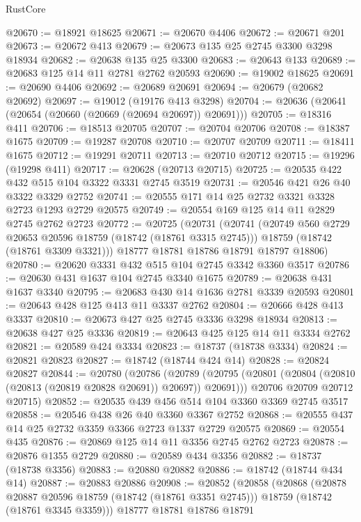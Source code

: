 \begin{lexlean}{RustCore}
\begin{coremodule}
@20670 := @18921 @18625
@20671 := @20670 @4406
@20672 := @20671 @201
@20673 := @20672 @413
@20679 := @20673 @135 @25 @2745 @3300 @3298 @18934
@20682 := @20638 @135 @25 @3300
@20683 := @20643 @133
@20689 := @20683 @125 @14 @11 @2781 @2762 @20593
@20690 := @19002 @18625
@20691 := @20690 @4406
@20692 := @20689 @20691
@20694 := @20679 (@20682 @20692)
@20697 := @19012 (@19176 @413 @3298)
@20704 := @20636 (@20641 (@20654 (@20660 (@20669 (@20694 @20697)) @20691)))
@20705 := @18316 @411
@20706 := @18513 @20705
@20707 := @20704 @20706
@20708 := @18387 @1675
@20709 := @19287 @20708
@20710 := @20707 @20709
@20711 := @18411 @1675
@20712 := @19291 @20711
@20713 := @20710 @20712
@20715 := @19296 (@19298 @411)
@20717 := @20628 (@20713 @20715)
@20725 := @20535 @422 @432 @515 @104 @3322 @3331 @2745 @3519
@20731 := @20546 @421 @26 @40 @3322 @3329 @2752
@20741 := @20555 @171 @14 @25 @2732 @3321 @3328 @2723 @1293 @2729 @20575
@20749 := @20554 @169 @125 @14 @11 @2829 @2745 @2762 @2723
@20772 := @20725
    (@20731
      (@20741
        (@20749 @560 @2729 @20653 @20596 @18759 (@18742 (@18761 @3315 @2745)))
        @18759
        (@18742 (@18761 @3309 @3321)))
      @18777
      @18781
      @18786
      @18791
      @18797
      @18806)
@20780 := @20620 @3331 @432 @515 @104 @2745 @3342 @3360 @3517
@20786 := @20630 @431 @1637 @104 @2745 @3340 @1675
@20789 := @20638 @431 @1637 @3340
@20795 := @20683 @430 @14 @1636 @2781 @3339 @20593
@20801 := @20643 @428 @125 @413 @11 @3337 @2762
@20804 := @20666 @428 @413 @3337
@20810 := @20673 @427 @25 @2745 @3336 @3298 @18934
@20813 := @20638 @427 @25 @3336
@20819 := @20643 @425 @125 @14 @11 @3334 @2762
@20821 := @20589 @424 @3334
@20823 := @18737 (@18738 @3334)
@20824 := @20821 @20823
@20827 := @18742 (@18744 @424 @14)
@20828 := @20824 @20827
@20844 := @20780
    (@20786
      (@20789 (@20795 (@20801 (@20804 (@20810 (@20813 (@20819 @20828 @20691)) @20697)) @20691)))
      @20706
      @20709
      @20712
      @20715)
@20852 := @20535 @439 @456 @514 @104 @3360 @3369 @2745 @3517
@20858 := @20546 @438 @26 @40 @3360 @3367 @2752
@20868 := @20555 @437 @14 @25 @2732 @3359 @3366 @2723 @1337 @2729 @20575
@20869 := @20554 @435
@20876 := @20869 @125 @14 @11 @3356 @2745 @2762 @2723
@20878 := @20876 @1355 @2729
@20880 := @20589 @434 @3356
@20882 := @18737 (@18738 @3356)
@20883 := @20880 @20882
@20886 := @18742 (@18744 @434 @14)
@20887 := @20883 @20886
@20908 := @20852
    (@20858
      (@20868
        (@20878 @20887 @20596 @18759 (@18742 (@18761 @3351 @2745)))
        @18759
        (@18742 (@18761 @3345 @3359)))
      @18777
      @18781
      @18786
      @18791

\end{coremodule}
\end{lexlean}
